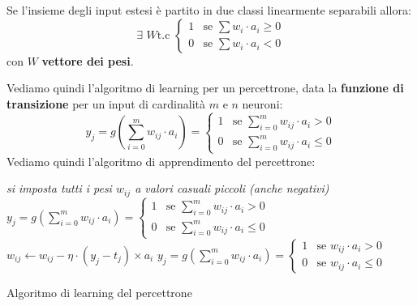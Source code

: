 \begin{definizione}
	Se l'insieme degli input estesi è partito in due classi linearmente separabili
	allora:
	\[\exists\,\, W\mbox{t.c }
		\begin{cases}
			1 & \mbox{se } \sum w_i\cdot a_i \geq 0 \\
			0 & \mbox{se } \sum w_i\cdot a_i < 0    
		\end{cases}
	\]
	con $W$ \textbf{vettore dei pesi}.
\end{definizione}
Vediamo quindi l'algoritmo di learning per un percettrone, data la
\textbf{funzione di transizione} per un input di cardinalità $m$ e $n$ neuroni:
\[
	y_j=g\left(\sum_{i=0}^m w_{ij}\cdot a_i \right)=
	\begin{cases}
		1 & \mbox{se } \sum_{i=0}^m w_{ij}\cdot a_i > 0    \\
		0 & \mbox{se } \sum_{i=0}^m w_{ij}\cdot a_i \leq 0 
	\end{cases}
\]
Vediamo quindi l'algoritmo di apprendimento del percettrone:
\begin{algorithm}[H]
	\begin{algorithmic}
		\State \textit{\color{gray}{\# Inizializzazione}}
		\State \textit{si imposta tutti i pesi $w_{ij}$ a valori casuali piccoli
		(anche negativi)}
		\State \textit{\color{gray}{\# Training}}
		\State \small{}
		\State \small{} 
		\State $y_j=g\left(\sum_{i=0}^m w_{ij}\cdot a_i \right)=
		\begin{cases} 1
			  & \mbox{se } \sum_{i=0}^m w_{ij}\cdot a_i > 0 \\ 0 &\mbox{se }
			\sum_{i=0}^m w_{ij}\cdot a_i \leq 0
		\end{cases}$ 
		\State $w_{ij}\gets w_{ij}-\eta\cdot(y_j-t_j)\times a_i$
		\EndFor
		\EndFor
		\State \small{} 
		\State $y_j=g\left(\sum_{i=0}^m w_{ij}\cdot a_i \right)=
		\begin{cases} 1
			  & \mbox{se } w_{ij}\cdot a_i > 0 \\ 0 &\mbox{se }
			w_{ij}\cdot a_i \leq 0
		\end{cases}$
		\EndFunction
	\end{algorithmic}
	\caption{Algoritmo di learning del percettrone}
\end{algorithm}
